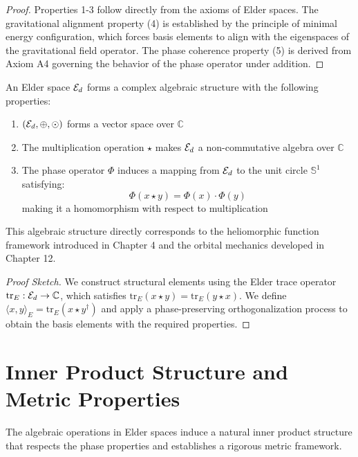 \begin{proof}
Properties 1-3 follow directly from the axioms of Elder spaces. The gravitational alignment property (4) is established by the principle of minimal energy configuration, which forces basis elements to align with the eigenspaces of the gravitational field operator. The phase coherence property (5) is derived from Axiom A4 governing the behavior of the phase operator under addition.
\end{proof}

\begin{corollary}
An Elder space $\mathcal{E}_{d}$ forms a complex algebraic structure with the following properties:
\begin{enumerate}
    \item $(\mathcal{E}_{d}, \oplus, \odot)$ forms a vector space over $\mathbb{C}$
    \item The multiplication operation $\star$ makes $\mathcal{E}_{d}$ a non-commutative algebra over $\mathbb{C}$
    \item The phase operator $\Phi$ induces a mapping from $\mathcal{E}_{d}$ to the unit circle $\mathbb{S}^1$ satisfying:
    \begin{equation}
        \Phi(x \star y) = \Phi(x) \cdot \Phi(y)
    \end{equation}
    making it a homomorphism with respect to multiplication
\end{enumerate}
This algebraic structure directly corresponds to the heliomorphic function framework introduced in Chapter 4 and the orbital mechanics developed in Chapter 12.
\end{corollary}

\begin{proof}[Proof Sketch]
We construct structural elements using the Elder trace operator $\mathrm{tr}_E: \mathcal{E}_{d} \rightarrow \mathbb{C}$, which satisfies $\mathrm{tr}_E(x \star y) = \mathrm{tr}_E(y \star x)$. We define $\langle x, y \rangle_E = \mathrm{tr}_E(x \star y^{\dagger})$ and apply a phase-preserving orthogonalization process to obtain the basis elements with the required properties.
\end{proof}

\section{Inner Product Structure and Metric Properties}

The algebraic operations in Elder spaces induce a natural inner product structure that respects the phase properties and establishes a rigorous metric framework.

